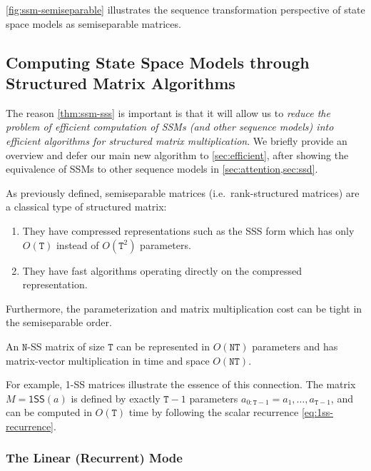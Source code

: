 \ref{fig:ssm-semiseparable} illustrates the sequence transformation perspective of state space models as semiseparable matrices.

\subsection{Computing State Space Models through Structured Matrix Algorithms}
\label{sec:ssm:algorithms}

The reason \ref{thm:ssm-sss} is important is that it will allow us to \emph{reduce the problem of efficient computation of SSMs (and other sequence models) into efficient algorithms for structured matrix multiplication}. We briefly provide an overview and defer our main new algorithm to \ref{sec:efficient}, after showing the equivalence of SSMs to other sequence models in
\ref{sec:attention,sec:ssd}.

As previously defined, semiseparable matrices (i.e.\ rank-structured matrices) are a classical type of structured matrix:

\begin{enumerate}[label=(\roman*)]
  \item They have compressed representations such as the SSS form which has only $O(\mathtt{T})$ instead of $O(\mathtt{T}^2)$ parameters.
  \item They have fast algorithms operating directly on the compressed representation.
\end{enumerate}

Furthermore, the parameterization and matrix multiplication cost can be tight in the semiseparable order.

\begin{proposition}
  \label{prop:ss-mvm}
  An $\mathtt{N}$-SS matrix of size $\mathtt{T}$ can be represented in $O(\mathtt{NT})$ parameters and has matrix-vector multiplication in time and space $O(\mathtt{NT})$.
\end{proposition}

For example, 1-SS matrices illustrate the essence of this connection. The matrix $M = \mathsf{1SS}(a)$ is defined by exactly $\mathtt{T}-1$ parameters $a_{0:\mathtt{T}-1} = a_1, \dots, a_{\mathtt{T}-1}$,
and can be computed in $O(\mathtt{T})$ time by following the scalar recurrence \eqref{eq:1ss-recurrence}.

\subsubsection{The Linear (Recurrent) Mode}
\label{sec:ssm:algorithms:linear}

